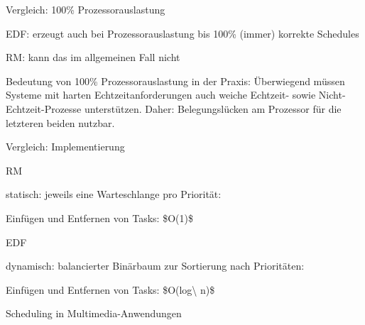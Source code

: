 \documentclass[a4paper]{article}
\begin{document}
\begin{multicols}{3}
    Vergleich: 100\% Prozessorauslastung

    \begin{itemize*}
        \item
        EDF: erzeugt auch bei Prozessorauslastung bis 100\% (immer) korrekte
        Schedules
        \item
        RM: kann das im allgemeinen Fall nicht
        \item
        Bedeutung von 100\% Prozessorauslastung in der Praxis: Überwiegend
        müssen Systeme mit harten Echtzeitanforderungen auch weiche Echtzeit-
        sowie Nicht-Echtzeit-Prozesse unterstützen. Daher: Belegungslücken am
        Prozessor für die letzteren beiden nutzbar.
    \end{itemize*}

    Vergleich: Implementierung

    \begin{itemize*}
        \item
        RM
        \begin{itemize*}
            \item statisch: jeweils eine Warteschlange pro Priorität:
            \item Einfügen und Entfernen von Tasks: \$O(1)\$
        \end{itemize*}
        \item
        EDF
        \begin{itemize*}
            \item dynamisch: balancierter Binärbaum zur Sortierung nach Prioritäten:
            \item Einfügen und Entfernen von Tasks: \$O(log\textbackslash{} n)\$
        \end{itemize*}
    \end{itemize*}

    Scheduling in Multimedia-Anwendungen


\end{multicols}
\end{document}
